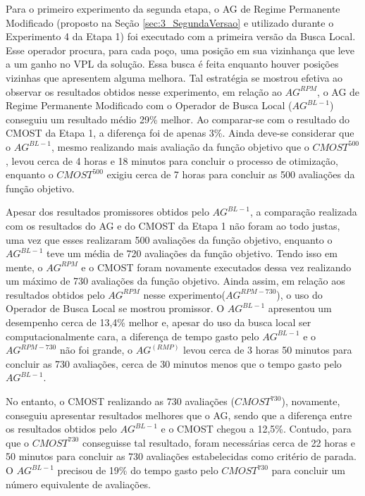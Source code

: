 Para o primeiro experimento da segunda etapa, o AG de Regime Permanente Modificado (proposto na Seção \ref{sec:3_SegundaVersao} e utilizado durante o Experimento 4 da Etapa 1) foi executado com a primeira versão da Busca Local. Esse operador procura, para cada poço, uma posição em sua vizinhança que leve a um ganho no VPL da solução. Essa busca é feita enquanto houver posições vizinhas que apresentem alguma melhora. Tal estratégia se mostrou efetiva ao observar os resultados obtidos nesse experimento, em relação ao $AG^{RPM}$, o AG de Regime Permanente Modificado com o Operador de Busca Local ($AG^{BL-1}$) conseguiu um resultado médio 29\% melhor. Ao comparar-se com o resultado do CMOST da Etapa 1, a diferença foi de apenas 3\%. Ainda deve-se considerar que o $AG^{BL-1}$, mesmo realizando mais avaliação da função objetivo que o $CMOST^{500}$, levou cerca de 4 horas e 18 minutos para concluir o processo de otimização, enquanto o $CMOST^{500}$ exigiu cerca de 7 horas para concluir as 500 avaliações da função objetivo.

Apesar dos resultados promissores obtidos pelo $AG^{BL-1}$, a comparação realizada com os resultados do AG e do CMOST da Etapa 1 não foram ao todo justas, uma vez que esses realizaram 500 avaliações da função objetivo, enquanto o $AG^{BL-1}$ teve um média de 720 avaliações da função objetivo. Tendo isso em mente, o $AG^{RPM}$ e o CMOST foram novamente executados dessa vez realizando um máximo de 730 avaliações da função objetivo. Ainda assim, em relação aos resultados obtidos pelo $AG^{RPM}$ nesse experimento($AG^{RPM-730}$), o uso do Operador de Busca Local se mostrou promissor. O $AG^{BL-1}$ apresentou um desempenho cerca de 13,4\% melhor e, apesar do uso da busca local ser computacionalmente cara, a diferença de tempo gasto pelo $AG^{BL-1}$ e o $AG^{RPM-730}$ não foi grande, o $AG^(RMP)$ levou cerca de 3 horas 50 minutos para concluir as 730 avaliações, cerca de 30 minutos menos que o tempo gasto pelo $AG^{BL-1}$.

No entanto, o CMOST realizando as 730 avaliações ($CMOST^{730}$), novamente, conseguiu apresentar resultados melhores que o AG, sendo que a diferença entre os resultados obtidos pelo $AG^{BL-1}$ e o CMOST chegou a 12,5\%. Contudo, para que o $CMOST^{730}$ conseguisse tal resultado, foram necessárias cerca de 22 horas e 50 minutos para concluir as 730 avaliações estabelecidas como critério de parada. O $AG^{BL-1}$ precisou de 19\% do tempo gasto pelo $CMOST^{730}$ para concluir um número equivalente de avaliações.

